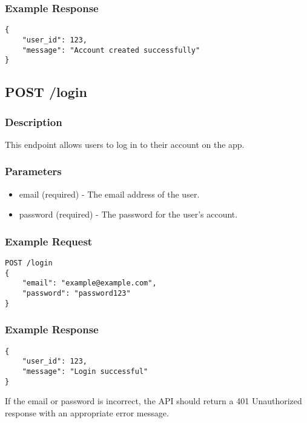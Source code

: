 \documentclass{article}
\begin{document}
\subsubsection{Example Response}

\begin{verbatim}
{
    "user_id": 123,
    "message": "Account created successfully"
}
\end{verbatim}

\subsection{POST /login}

\subsubsection{Description}

This endpoint allows users to log in to their account on the app.

\subsubsection{Parameters}

\begin{itemize}
\item email (required) - The email address of the user.
\item password (required) - The password for the user's account.
\end{itemize}

\subsubsection{Example Request}

\begin{verbatim}
POST /login
{
    "email": "example@example.com",
    "password": "password123"
}
\end{verbatim}

\subsubsection{Example Response}

\begin{verbatim}
{
    "user_id": 123,
    "message": "Login successful"
}
\end{verbatim}

If the email or password is incorrect, the API should return a 401 Unauthorized response with an appropriate error message.
\end{document}
